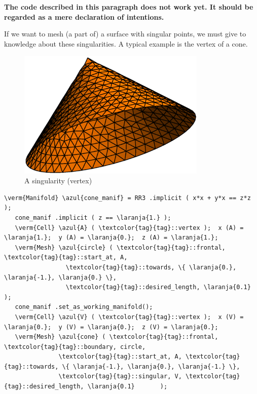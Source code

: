 \section{~~}\label{\numb section 3.\numb parag 20}

{\normalfont\bfseries The code described in this paragraph does not work yet.
It should be regarded as a mere declaration of intentions.}
\medskip

If we want to mesh (a part of) a surface with singular points, we must give to {\maniFEM}
knowledge about these singularities.
A typical example is the vertex of a cone.

\begin{figure}[ht] \centering
 \includegraphics[width=90mm]{cone}
  \caption{A singularity (vertex)}
  \label{\numb section 3.\numb fig 9}
\end{figure}

\begin{Verbatim}[commandchars=\\\{\},formatcom=\small\tt,frame=single,
   label=code not working,rulecolor=\color{moldura},
   baselinestretch=0.94,framesep=2mm                                  ]
   \verm{Manifold} \azul{cone_manif} = RR3 .implicit ( x*x + y*x == z*z );
   cone_manif .implicit ( z == \laranja{1.} );
   \verm{Cell} \azul{A} ( \textcolor{tag}{tag}::vertex );  x (A) = \laranja{1.};  y (A) = \laranja{0.};  z (A) = \laranja{1.};
   \verm{Mesh} \azul{circle} ( \textcolor{tag}{tag}::frontal, \textcolor{tag}{tag}::start_at, A,
                 \textcolor{tag}{tag}::towards, \{ \laranja{0.}, \laranja{-1.}, \laranja{0.} \},
                 \textcolor{tag}{tag}::desired_length, \laranja{0.1}       );
   cone_manif .set_as_working_manifold();
   \verm{Cell} \azul{V} ( \textcolor{tag}{tag}::vertex );  x (V) = \laranja{0.};  y (V) = \laranja{0.};  z (V) = \laranja{0.};
   \verm{Mesh} \azul{cone} ( \textcolor{tag}{tag}::frontal, \textcolor{tag}{tag}::boundary, circle,
               \textcolor{tag}{tag}::start_at, A, \textcolor{tag}{tag}::towards, \{ \laranja{-1.}, \laranja{0.}, \laranja{-1.} \},
               \textcolor{tag}{tag}::singular, V, \textcolor{tag}{tag}::desired_length, \laranja{0.1}       );
\end{Verbatim}


